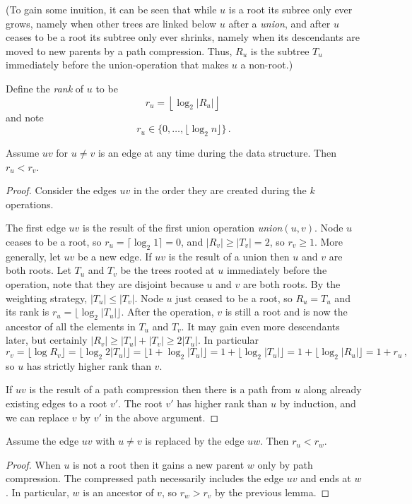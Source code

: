 \documentclass{tstextbook}
\begin{document}
(To gain some inuition, it can be seen that while $u$ is a root its subree only ever grows, namely when other trees are linked below $u$ after a \emph{union}, and after $u$ ceases to be a root its subtree only ever shrinks, namely when its descendants are moved to new parents by a path compression.
Thus, $R_u$ is the subtree $T_u$ immediately before the union-operation that makes $u$ a non-root.)

Define the \emph{rank} of $u$ to be \[ r_u= \left\lfloor \log_2 |R_u|\right\rfloor\,\]
and note 
\[ r_u\in\{0,\ldots, \lfloor\log_2 n\rfloor \}\,.\]

\begin{lemma}%
  \label{lem:ranksincrease}
  Assume $uv$ for $u\neq v$ is an edge at any time during the data structure.
  Then $r_u<r_v$.
\end{lemma}

\begin{proof}
  Consider the edges $uv$ in the order they are created during the $k$ operations.

  The first edge $uv$ is the result of the first union operation \emph{union}$(u,v)$.
  Node $u$ ceases to be a root, so $r_u = \lceil \log_2 1\rceil =0$, and $|R_v|\geq |T_v| =2$, so $r_v\geq 1$.
  More generally, let $uv$ be a new edge.
  If $uv$ is the result of a union then $u$ and $v$ are both roots.
  Let $T_u$ and $T_v$ be the trees rooted at $u$ immediately before the operation,
  note that they are disjoint because $u$ and $v$ are both roots.
  By the weighting strategy, $|T_u|\leq |T_v|$.
  Node $u$ just ceased to be a root, so $R_u= T_u$ and its rank is $r_u =\lfloor \log_2 |T_u| \rfloor$.
  After the operation, $v$ is still a root and is now the ancestor of all the elements in $T_u$ and $T_v$.
  It may gain even more descendants later, but certainly $|R_v|\geq |T_u| + |T_v| \geq 2|T_u|$.
  In particular
  \[ 
    r _v = 
    \lfloor\log R_v\rfloor  =
    \lfloor\log_2 2|T_u|\rfloor =
    \lfloor 1 + \log_2 |T_u|\rfloor = 
    1 + \lfloor\log_2 |T_u|\rfloor =
    1 + \lfloor\log_2|R_u|\rfloor = 1 + r_u\,,
    \]
  so $u$ has strictly higher rank than $v$.

  If $uv$ is the result of a path compression then there is a path from $u$ along already existing edges to a root $v'$.
  The root $v'$ has higher rank than $u$ by induction, and we can replace $v$ by $v'$ in the above argument.
\end{proof}

\begin{lemma}%
  \label{lem:parentrank}
  Assume the edge $uv$ with $u\neq v$ is replaced by the edge $uw$. 
  Then $r_u<r_w$.
\end{lemma}
\begin{proof}
  When $u$ is not a root then it gains a new parent $w$ only by path compression.
  The compressed path necessarily includes the edge $uv$ and ends at $w$.
  In particular, $w$ is an ancestor of $v$, so $r_w>r_v$ by the previous lemma.
\end{proof}
\end{document}
